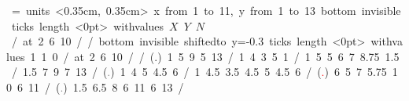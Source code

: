 \let\put\pictexput
\mbox{\beginpicture
\headingtoplotskip=\baselineskip
\setcoordinatesystem units <0.35cm, 0.35cm>
\setplotarea x from 1 to 11, y from 1 to 13
\axis bottom invisible ticks length <0pt>
  withvalues {$X$} {$Y$} {$N$} /  at 2 6 10 / /
\axis bottom invisible shiftedto y=-0.3 ticks length <0pt>
withvalues {1} {1} {0} /  at 2 6 10 / /
\setplotsymbol ({\normalsize .})
 1 5 9 5 13 /
 1 4 3 5 1 / 
 1 5 5 6 7 8.75 1.5 /
 1.5 7 9 7 13 /
\setplotsymbol ({\textcolor{gray}{\scriptsize .}})
 1 4 5 4.5 6 /
 1 4.5 3.5 4.5 5 4.5 6 /
\setplotsymbol ({\textcolor{red}{\scriptsize .}})
 6 5 7 5.75 10 6 11 /
\setplotsymbol ({\textcolor{gray}{\scriptsize .}})
 1.5 6.5 8 6 11 6 13 /
\endpicture}
\let\put\latexput
